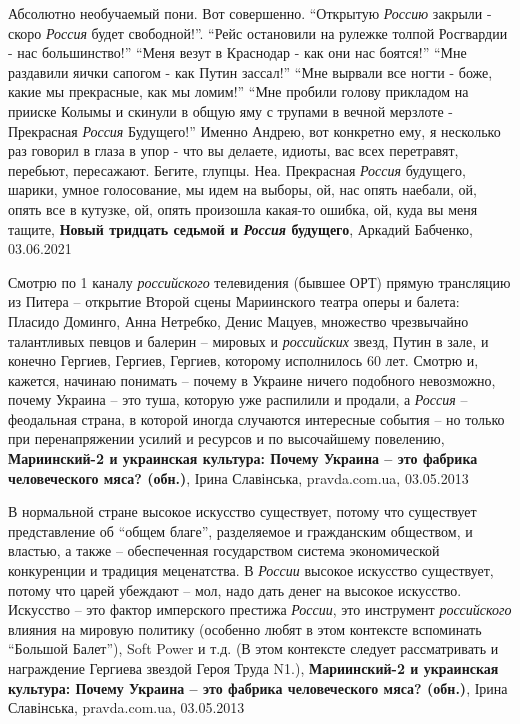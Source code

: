 Абсолютно необучаемый пони. Вот совершенно. \enquote{Открытую \emph{Россию} закрыли - скоро
\emph{Россия} будет свободной!}. \enquote{Рейс остановили на рулежке толпой Росгвардии - нас
большинство!} \enquote{Меня везут в Краснодар - как они нас боятся!} \enquote{Мне раздавили
яички сапогом - как Путин зассал!} \enquote{Мне вырвали все ногти - боже, какие мы
прекрасные, как мы ломим!} \enquote{Мне пробили голову прикладом на прииске Колымы и
скинули в общую яму с трупами в вечной мерзлоте - Прекрасная \emph{Россия} Будущего!}
Именно Андрею, вот конкретно ему, я несколько раз говорил в глаза в упор - что
вы делаете, идиоты, вас всех перетравят, перебьют, пересажают. Бегите, глупцы.
Неа. Прекрасная \emph{Россия} будущего, шарики, умное голосование, мы идем на выборы,
ой, нас опять наебали, ой, опять все в кутузке, ой, опять произошла какая-то
ошибка, ой, куда вы меня тащите,
\textbf{Новый тридцать седьмой и \emph{Россия} будущего}, Аркадий Бабченко, 03.06.2021

Смотрю по 1 каналу \emph{российского} телевидения (бывшее ОРТ) прямую
трансляцию из Питера – открытие Второй сцены Мариинского театра оперы и балета:
Пласидо Доминго, Анна Нетребко, Денис Мацуев, множество чрезвычайно талантливых
певцов и балерин – мировых и \emph{российских} звезд, Путин в зале, и конечно
Гергиев, Гергиев, Гергиев, которому исполнилось 60 лет.  Смотрю и, кажется,
начинаю понимать – почему в Украине ничего подобного невозможно, почему Украина
– это туша, которую уже распилили и продали, а \emph{Россия} – феодальная
страна, в которой иногда случаются интересные события – но только при
перенапряжении усилий и ресурсов и по высочайшему повелению,
\textbf{Мариинский-2 и украинская культура: Почему Украина – это фабрика человеческого мяса? (обн.)},
Ірина Славінська, pravda.com.ua, 03.05.2013

В нормальной стране высокое искусство существует, потому что существует
представление об \enquote{общем благе}, разделяемое и гражданским обществом, и властью,
а также – обеспеченная государством система экономической конкуренции и
традиция меценатства.  В \emph{России} высокое искусство существует, потому что царей
убеждают – мол, надо дать денег на высокое искусство. Искусство – это фактор
имперского престижа \emph{России}, это инструмент \emph{российского} влияния на мировую
политику (особенно любят в этом контексте вспоминать \enquote{Большой Балет}), Soft
Power и т.д. (В этом контексте следует рассматривать и награждение Гергиева
звездой Героя Труда N1.),
\textbf{Мариинский-2 и украинская культура: Почему Украина – это фабрика человеческого мяса? (обн.)},
Ірина Славінська, pravda.com.ua, 03.05.2013

